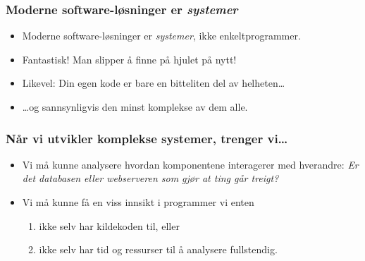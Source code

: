 \documentclass{beamer}
\begin{document}
\begin{frame}
    \frametitle{Moderne software-løsninger er \emph{systemer}}

\begin{itemize}

    \item Moderne software-løsninger er \emph{systemer}, ikke enkeltprogrammer.

    \item  Fantastisk! Man slipper å finne på hjulet på nytt!

    \item Likevel: Din egen kode er bare en bitteliten del av helheten…

    \item …og sannsynligvis den minst komplekse av dem alle.



\end{itemize}
\end{frame}

\begin{frame}
    \frametitle{Når vi utvikler komplekse systemer, trenger vi…}
\begin{itemize}

    \item Vi må kunne analysere hvordan komponentene interagerer med hverandre:
        \emph{Er det databasen eller webserveren som gjør at ting går treigt?}

    \item Vi må kunne få en viss innsikt i programmer vi enten
        \begin{enumerate}
            \item ikke selv har kildekoden til, eller
            \item ikke selv har tid og ressurser til å analysere fullstendig.
            \end{enumerate}

\end{itemize}
\end{frame}
\end{document}
